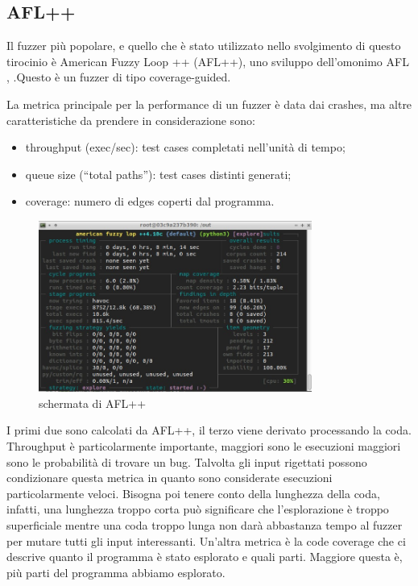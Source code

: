 \subsection{AFL++}

Il fuzzer più popolare, e quello che è stato utilizzato nello svolgimento di questo tirocinio è American Fuzzy Loop ++ (AFL++), uno sviluppo dell’omonimo AFL \cite{ref11}, \cite{ref24}.Questo è un fuzzer di tipo coverage-guided. 

La metrica principale per la performance di un fuzzer è data dai crashes, ma altre caratteristiche da prendere in considerazione sono:
\begin{itemize}
    \item throughput (exec/sec): test cases completati nell’unità di tempo;
    \item queue size (“total paths”): test cases distinti generati;
    \item coverage: numero di edges coperti dal programma.
\end{itemize}

\begin{figure}[htbp]        
  \centering               
  \includegraphics[width=0.8\textwidth]{immagini/AFL++.jpg}  
  \caption{schermata di AFL++}  
  \label{fig:afl++}      
\end{figure}

I primi due sono calcolati da AFL++,  il terzo viene derivato processando la coda. 
Throughput è particolarmente importante, maggiori sono le esecuzioni maggiori sono le probabilità di trovare un bug. Talvolta gli input rigettati possono condizionare questa metrica in quanto sono considerate esecuzioni particolarmente veloci. 
Bisogna poi tenere conto della lunghezza della coda, infatti, una lunghezza troppo corta può significare che l’esplorazione è troppo superficiale mentre una coda troppo lunga non darà abbastanza tempo al fuzzer per mutare tutti gli input interessanti. 
Un’altra metrica è la code coverage che ci descrive quanto il programma è stato esplorato e quali parti. Maggiore questa è, più parti del programma abbiamo esplorato. 

